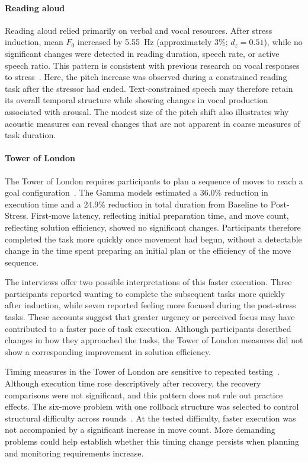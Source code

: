 \paragraph{Reading aloud}

Reading aloud relied primarily on verbal and vocal resources. After stress induction, mean \(F_0\) increased by 5.55~Hz (approximately 3\%; \(d_z = 0.51\)), while no significant changes were detected in reading duration, speech rate, or active speech ratio. This pattern is consistent with previous research on vocal responses to stress~\citep{kappen2022acoustic,schewski2025measuring,pisanski2018multimodal}. Here, the pitch increase was observed during a constrained reading task after the stressor had ended. Text-constrained speech may therefore retain its overall temporal structure while showing changes in vocal production associated with arousal. The modest size of the pitch shift also illustrates why acoustic measures can reveal changes that are not apparent in coarse measures of task duration.

\paragraph{Tower of London}
The Tower of London requires participants to plan a sequence of moves to reach a goal configuration~\citep{shallice1982specific}. The Gamma models estimated a 36.0\% reduction in execution time and a 24.9\% reduction in total duration from Baseline to Post-Stress. First-move latency, reflecting initial preparation time, and move count, reflecting solution efficiency, showed no significant changes. Participants therefore completed the task more quickly once movement had begun, without a detectable change in the time spent preparing an initial plan or the efficiency of the move sequence.

The interviews offer two possible interpretations of this faster execution. Three participants reported wanting to complete the subsequent tasks more quickly after induction, while seven reported feeling more focused during the post-stress tasks. These accounts suggest that greater urgency or perceived focus may have contributed to a faster pace of task execution. Although participants described changes in how they approached the tasks, the Tower of London measures did not show a corresponding improvement in solution efficiency.

Timing measures in the Tower of London are sensitive to repeated testing~\citep{kostering2015test}. Although execution time rose descriptively after recovery, the recovery comparisons were not significant, and this pattern does not rule out practice effects. The six-move problem with one rollback structure was selected to control structural difficulty across rounds~\citep{kaller2004impact,kaller2012assessing}. At the tested difficulty, faster execution was not accompanied by a significant increase in move count. More demanding problems could help establish whether this timing change persists when planning and monitoring requirements increase.

